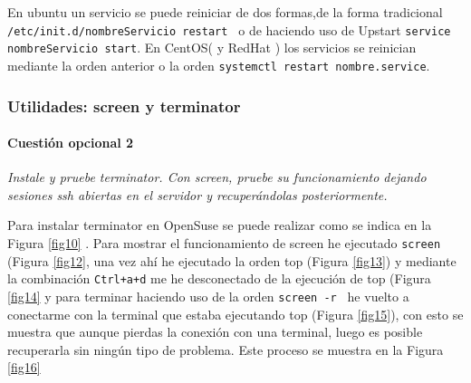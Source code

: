 En ubuntu un servicio se puede reiniciar de dos formas,de la forma tradicional \newline
 \texttt{ /etc/init.d/nombreServicio restart } o de haciendo uso de  Upstart \newline
 \texttt{service nombreServicio start}. \cite{rest1} En CentOS( y RedHat ) los servicios se reinician mediante la orden anterior o la orden
 \texttt{systemctl restart nombre.service}. \cite{rest2}

\subsubsection{Utilidades: screen y terminator}
\paragraph{Cuestión opcional 2}
\textit{Instale y pruebe terminator. Con screen, pruebe su funcionamiento dejando sesiones ssh abiertas en el servidor y recuperándolas posteriormente.}
\newline

Para instalar terminator en OpenSuse se puede realizar como se indica en la Figura \ref{fig10} . Para mostrar el funcionamiento de screen he ejecutado \texttt{screen} (Figura \ref{fig12}, una vez ahí he ejecutado la orden top (Figura \ref{fig13}) y mediante la combinación \texttt{Ctrl+a+d} me he desconectado de la ejecución de top (Figura \ref{fig14} y para terminar haciendo uso de la orden \texttt{screen -r } he vuelto a conectarme con la terminal que estaba ejecutando top (Figura \ref{fig15}), con esto se muestra que aunque pierdas la conexión con una terminal, luego es posible recuperarla sin ningún tipo de problema. Este proceso se muestra en la Figura \ref{fig16}


